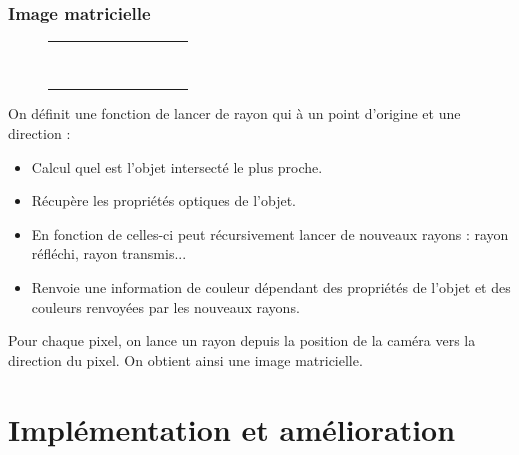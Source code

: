 \documentclass[handout]{beamer}
\begin{document}
\begin{frame}
    \frametitle{Image matricielle}

    \begin{figure}
    \begin{tabular}{ | c | c | c | c | c | c | c | c | c | c | }
        \hline
        & & & & & & & & & \\
        \hline
        & & & & & & & & & \\
        \hline
        & & & & & & & & & \\
        \hline
        & & & & & & & & & \\
        \hline
        & & & & & & & & & \\
        \hline
        & & & & & & & & & \\
        \hline
        & & & & & & & & & \\
        \hline
        & & & & & & & & & \\
        \hline
        & & & & & & & & & \\
        \hline
        & & & & & & & & & \\
        \hline
    \end{tabular}
    \end{figure}

\end{frame}

\begin{frame}
    On définit une fonction de lancer de rayon qui à un point d'origine et une direction :
    \begin{itemize}
        \item Calcul quel est l'objet intersecté le plus proche.
        \item Récupère les propriétés optiques de l'objet.
        \item En fonction de celles-ci peut récursivement lancer de nouveaux rayons : rayon réfléchi, rayon transmis...
        \item Renvoie une information de couleur dépendant des propriétés de l'objet et des couleurs renvoyées par les nouveaux rayons.
    \end{itemize}
    Pour chaque pixel, on lance un rayon depuis la position de la caméra vers la direction du pixel.
    On obtient ainsi une image matricielle.
\end{frame}

\section{Implémentation et amélioration}
\end{document}
